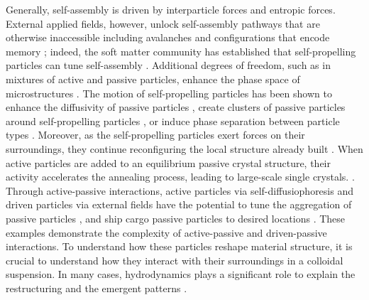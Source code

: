 \documentclass[12pt]{article}
\begin{document}
Generally, self-assembly is driven by interparticle forces and entropic forces. External applied fields, however, unlock self-assembly pathways that are otherwise inaccessible including avalanches \cite{driscoll_leveraging_2019} and configurations that encode memory \cite{kaz_physical_2012,zhang_polar_2022}; indeed, the soft matter community has established that self-propelling particles can tune self-assembly \cite{massana-cid_active_2018,omar_swimming_2019}. Additional degrees of freedom, such as in mixtures of active and passive particles, enhance the phase space of microstructures \cite{mallory_active_2018,madden_hydrodynamically_2022}. The motion of self-propelling particles has been shown to enhance the diffusivity of passive particles \cite{mino_enhanced_2011,jepson_enhanced_2013}, create clusters of passive particles around self-propelling particles \cite{palacci_living_2013,katuri_inferring_2021}, or induce phase separation between particle types \cite{mccandlish_spontaneous_2012,cates_motility-induced_2015,stenhammar_activity-induced_2015,wysocki_propagating_2016,smrek_small_2017,dolai_phase_2018}. 
Moreover, as the self-propelling particles exert forces on their surroundings, they continue reconfiguring the local structure already built \cite{katuri_inferring_2021,singh_interaction_2022}.
When active particles are added to an equilibrium passive crystal structure, their activity accelerates the annealing process, leading to large-scale single crystals. \cite{ramananarivo_activity-controlled_2019}. 
%
%
Through active-passive interactions, active particles via self-diffusiophoresis \cite{illien_fuelled_2017} and driven particles via external fields have the potential to tune the aggregation of passive particles \cite{massana-cid_active_2018,omar_swimming_2019}, and ship cargo passive particles to desired locations \cite{petit_selective_2012,zhang_targeted_2012}. 
These examples demonstrate the complexity of active-passive and driven-passive interactions. To understand how these particles reshape material structure, it is crucial to understand how they interact with their surroundings in a colloidal suspension. In many cases, hydrodynamics plays a significant role to explain the restructuring and the emergent patterns \cite{katuri_inferring_2021,marchetti_hydrodynamics_2013,boniface_hydrodynamics_2023}.
\end{document}
